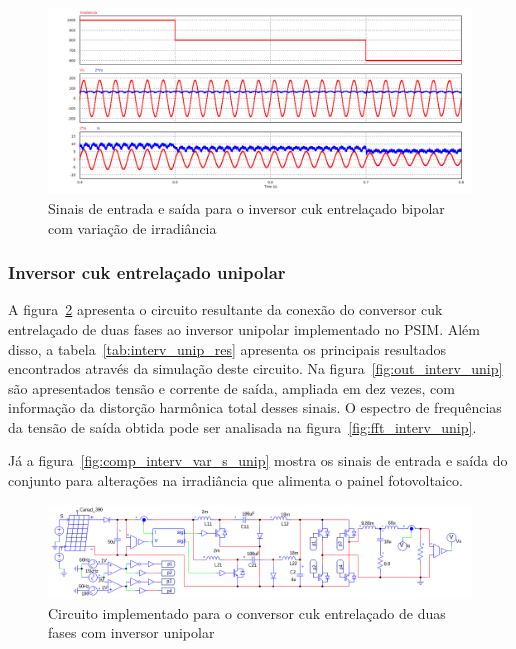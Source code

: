 \documentclass[
	12pt,				%
	openany,
	onseside,
	a4paper,			%
	english,			%
	french,				%
	spanish,			%
	brazil,				%
	]{abntex2}
\begin{document}
\begin{figure}[H]%
	\captionsetup{justification=centering}
	\centering
		\includegraphics[width= \linewidth]{comp_interv_var_s}
		\caption{Sinais de entrada e saída para o inversor cuk entrelaçado bipolar com variação de irradiância}
		\label{fig:comp_interv_var_s}
\end{figure}

\subsubsection{Inversor cuk entrelaçado unipolar}

A figura~\ref{fig:comp_interv_circ_clean_unip} apresenta o circuito resultante da conexão do conversor cuk entrelaçado de duas fases ao inversor unipolar implementado no PSIM. Além disso, a tabela~\ref{tab:interv_unip_res} apresenta os principais resultados encontrados através da simulação deste circuito. Na figura~\ref{fig:out_interv_unip} são apresentados tensão e corrente de saída, ampliada em dez vezes, com informação da distorção harmônica total desses sinais. O espectro de frequências da tensão de saída obtida pode ser analisada na figura~\ref{fig:fft_interv_unip}.

Já a figura~\ref{fig:comp_interv_var_s_unip} mostra os sinais de entrada e saída do conjunto para alterações na irradiância que alimenta o painel fotovoltaico.

\begin{figure}[H]%
	\captionsetup{justification=centering}
	\centering
		\includegraphics[width= \linewidth]{comp_interv_circ_clean_unip}
		\caption{Circuito implementado para o conversor cuk entrelaçado de duas fases com inversor unipolar}
		\label{fig:comp_interv_circ_clean_unip}
\end{figure}
\end{document}
